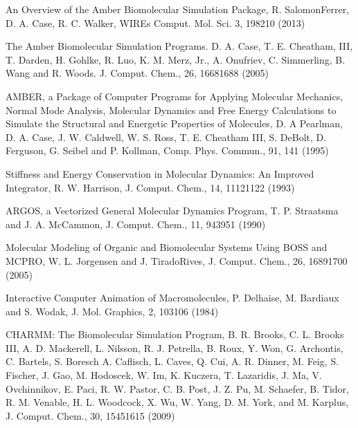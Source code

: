\documentclass[letterpaper,11pt,english]{sphinxmanual}
\begin{document}
\sphinxAtStartPar
{}

\sphinxAtStartPar
An Overview of the Amber Biomolecular Simulation Package, R. Salomon\sphinxhyphen{}Ferrer, D. A. Case, R. C. Walker, WIREs Comput. Mol. Sci. 3, 198\sphinxhyphen{}210 (2013)

\sphinxAtStartPar
The Amber Biomolecular Simulation Programs. D. A. Case, T. E. Cheatham, III, T. Darden, H. Gohlke, R. Luo, K. M. Merz, Jr., A. Onufriev, C. Simmerling, B. Wang and R. Woods. J. Comput. Chem., 26, 1668\sphinxhyphen{}1688 (2005)

\sphinxAtStartPar
AMBER, a Package of Computer Programs for Applying Molecular Mechanics, Normal Mode Analysis, Molecular Dynamics and Free Energy Calculations to Simulate the Structural and Energetic Properties of Molecules, D. A Pearlman, D. A. Case, J. W. Caldwell, W. S. Ross, T. E. Cheatham III, S. DeBolt, D. Ferguson, G. Seibel and P. Kollman, Comp. Phys. Commun., 91, 1\sphinxhyphen{}41 (1995)

\sphinxAtStartPar
{}

\sphinxAtStartPar
Stiffness and Energy Conservation in Molecular Dynamics: An Improved Integrator, R. W. Harrison, J. Comput. Chem., 14, 1112\sphinxhyphen{}1122 (1993)

\sphinxAtStartPar
{}

\sphinxAtStartPar
ARGOS, a Vectorized General Molecular Dynamics Program, T. P. Straatsma and J. A. McCammon, J. Comput. Chem., 11, 943\sphinxhyphen{}951 (1990)

\sphinxAtStartPar
{}

\sphinxAtStartPar
Molecular Modeling of Organic and Biomolecular Systems Using BOSS and MCPRO, W. L. Jorgensen and J. Tirado\sphinxhyphen{}Rives, J. Comput. Chem., 26, 1689\sphinxhyphen{}1700 (2005)

\sphinxAtStartPar
{}

\sphinxAtStartPar
Interactive Computer Animation of Macromolecules, P. Delhaise, M. Bardiaux and S. Wodak, J. Mol. Graphics, 2, 103\sphinxhyphen{}106 (1984)

\sphinxAtStartPar
{}

\sphinxAtStartPar
CHARMM: The Biomolecular Simulation Program, B. R. Brooks, C. L. Brooks III, A. D. Mackerell, L. Nilsson, R. J. Petrella, B. Roux, Y. Won, G. Archontis, C. Bartels, S. Boresch A. Caflisch, L. Caves, Q. Cui, A. R. Dinner, M. Feig, S. Fischer, J. Gao, M. Hodoscek, W. Im, K. Kuczera, T. Lazaridis, J. Ma, V. Ovchinnikov, E. Paci, R. W. Pastor, C. B. Post, J. Z. Pu, M. Schaefer, B. Tidor, R. M. Venable, H. L. Woodcock, X. Wu, W. Yang, D. M. York, and M. Karplus, J. Comput. Chem., 30, 1545\sphinxhyphen{}1615 (2009)
\end{document}
